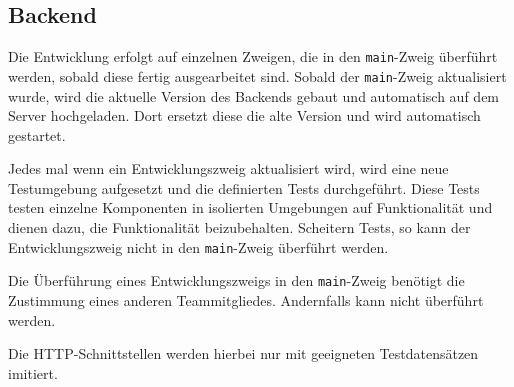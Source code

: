 \subsection{Backend}

Die Entwicklung erfolgt auf einzelnen Zweigen, die in den \verb#main#-Zweig überführt werden, sobald diese fertig ausgearbeitet sind.
Sobald der \verb#main#-Zweig aktualisiert wurde, wird die aktuelle Version des Backends gebaut und automatisch auf dem Server hochgeladen.
Dort ersetzt diese die alte Version und wird automatisch gestartet.

Jedes mal wenn ein Entwicklungszweig aktualisiert wird, wird eine neue Testumgebung aufgesetzt und die definierten Tests durchgeführt.
Diese Tests testen einzelne Komponenten in isolierten Umgebungen auf Funktionalität und dienen dazu, die Funktionalität beizubehalten.
Scheitern Tests, so kann der Entwicklungszweig nicht in den \verb#main#-Zweig überführt werden.

Die Überführung eines Entwicklungszweigs in den \verb#main#-Zweig benötigt die Zustimmung eines anderen Teammitgliedes.
Andernfalls kann nicht überführt werden.

Die HTTP-Schnittstellen werden hierbei nur mit geeigneten Testdatensätzen imitiert.
